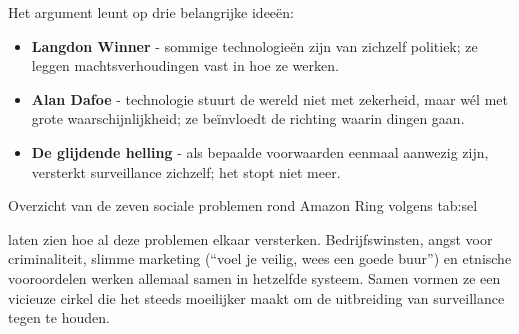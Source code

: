 \documentclass[nonacm, sigconf, balance=true]{acmart}
\begin{document}
    \vsmall

    \noindent Het argument leunt op drie belangrijke ideeën:
    \begin{itemize}
        \item \textbf{Langdon Winner} - sommige technologieën zijn van zichzelf politiek; ze leggen machtsverhoudingen vast in hoe ze werken.
        \item \textbf{Alan Dafoe} - technologie stuurt de wereld niet met zekerheid, maar wél met grote waarschijnlijkheid; ze beïnvloedt de richting waarin dingen gaan.
        \item \textbf{De glijdende helling} - als bepaalde voorwaarden eenmaal aanwezig zijn, versterkt surveillance zichzelf; het stopt niet meer.
    \end{itemize}

    \vsmall

    \begin{SimpleTable}[s{0.3}s{1.2}]
    {Overzicht van de zeven sociale problemen rond Amazon Ring volgens \citeauthor{selinger2022amazon}}
    {tab:sel}
    \end{SimpleTable}

    \citeauthor{selinger2022amazon} laten zien hoe al deze problemen elkaar versterken.
    Bedrijfswinsten, angst voor criminaliteit, slimme marketing (``voel je veilig, wees een goede buur'') en etnische vooroordelen werken allemaal samen in hetzelfde systeem.
    Samen vormen ze een vicieuze cirkel die het steeds moeilijker maakt om de uitbreiding van surveillance tegen te houden.
\end{document}
